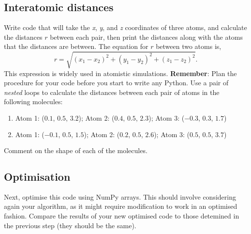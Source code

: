 \documentclass[a4paper]{article}
\begin{document}
\subsection{Interatomic distances}

Write code that will take the \emph{x}, \emph{y}, and \emph{z} coordinates of three atoms, and calculate the distances $r$ between each pair, then print the distances along with the atoms that the distances are between.
The equation for $r$ between two atoms is,
\begin{equation}
	r = \sqrt{(x_1 - x_2)^2 + (y_1 - y_2)^2 + (z_1 - z_2)^2}.
\end{equation}
This expression is widely used in atomistic simulations.
\textbf{Remember}: Plan the procedure for your code before you start to write any Python.
Use a pair of \emph{nested} loops to calculate the distances between each pair of atoms in the following molecules:
\begin{enumerate}
	\item{Atom 1: ($0.1$, $0.5$, $3.2$); Atom 2: ($0.4$, $0.5$, $2.3$); Atom 3: ($-0.3$, $0.3$, $1.7$)}
	\item{Atom 1: ($-0.1$, $0.5$, $1.5$); Atom 2: ($0.2$, $0.5$, $2.6$); Atom 3: ($0.5$, $0.5$, $3.7$)}
\end{enumerate}
Comment on the shape of each of the molecules.

\subsection{Optimisation}

Next, optimise this code using NumPy arrays.
This should involve considering again your algorithm, as it might require modification to work in an optimised fashion.
Compare the results of your new optimised code to those detemined in the previous step (they should be the same).



\end{document}
